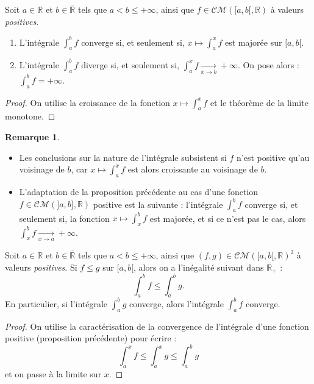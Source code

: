 \documentclass[french]{article}
\newcommand{\R}{\mathbb{R}}
\theoremstyle{plain}
\theoremstyle{definition}
\newtheorem*{rmq}{Remarque}
\theoremstyle{remark}
\begin{document}
\begin{prop}%
	Soit $a\in\R$ et $b\in\overline{\R}$ tels que $a<b\leqslant+\infty$, ainsi que $f\in\mathcal{CM}([a,b[,\R)$ à valeurs \textit{positives}.
	\begin{enumerate}
		\item L'intégrale $\displaystyle\int_{a}^{b}f$ converge si, et seulement si, $x\mapsto\displaystyle\int_{a}^{x}f$ est majorée sur $[a,b[$.
		\item L'intégrale $\displaystyle\int_{a}^{b}f$ diverge si, et seulement si, $\displaystyle\int_{a}^{x}f\xrightarrow[x\to b]{}+\infty$. On pose alors : $\displaystyle\int_{a}^{b}f=+\infty$.
	\end{enumerate}
\end{prop}
\begin{proof}
	On utilise la croissance de la fonction $x\mapsto\displaystyle\int_{a}^{x}f$ et le théorème de la limite monotone.
\end{proof}

\begin{rmq}
	\begin{itemize}
		\item Les conclusions sur la nature de l'intégrale subsistent si $f$ n'est positive qu'au voisinage de $b$, car $x\mapsto\displaystyle\int_{a}^{x}f$ est alors croissante au voisinage de $b$.
		\item L'adaptation de la proposition précédente au cas d'une fonction $f\in\mathcal{CM}(]a,b],\R)$ positive est la suivante : l'intégrale $\displaystyle\int_{a}^{b}f$ converge si, et seulement si, la fonction $x\mapsto\displaystyle\int_{x}^{b}f$ est majorée, et si ce n'est pas le cas, alors $\displaystyle\int_{x}^{b}f\xrightarrow[x\to a]{}+\infty$.
	\end{itemize}
\end{rmq}

\begin{prop}%
	Soit $a\in\R$ et $b\in\overline{\R}$ tels que $a<b\leqslant+\infty$, ainsi que $(f,g)\in\mathcal{CM}([a,b[,\R)^2$ à valeurs \textit{positives}.
	Si $f\leqslant g$ sur $[a,b[$, alors on a l'inégalité suivant dans $\overline{\R}_+$ : $$\int_{a}^{b}f\leqslant\int_{a}^{b}g.$$
	En particulier, si l'intégrale $\displaystyle\int_{a}^{b}g$ converge, alors l'intégrale $\displaystyle\int_{a}^{b}f$ converge.
\end{prop}
\begin{proof}
	On utilise la caractérisation de la convergence de l'intégrale d'une fonction positive (proposition précédente) pour écrire : $$\int_{a}^{x}f\leqslant\int_{a}^{x}g\leqslant\int_{a}^{b}g$$ et on passe à la limite sur $x$.
\end{proof}
\end{document}
